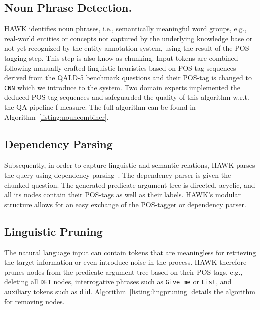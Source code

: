 \subsection{Noun Phrase Detection.}
HAWK identifies noun phrases, i.e., semantically meaningful word groups, e.g., real-world entities or concepts not captured by the underlying knowledge base or not yet recognized by the entity annotation system, using the result of the POS-tagging step. 
This step is also know as chunking. 
Input tokens are combined following manually-crafted linguistic heuristics based on POS-tag sequences derived from the \ac{QALD}-5 benchmark questions and their POS-tag is changed to \texttt{CNN} which we introduce to the system.
Two domain experts implemented the deduced POS-tag sequences and safeguarded the quality of this algorithm w.r.t. the \ac{QA} pipeline f-measure. 
The full algorithm can be found in Algorithm~\ref{listing:nouncombiner}.




\subsection{Dependency Parsing}

Subsequently, in order to capture linguistic and semantic relations, HAWK parses the query using dependency parsing~\cite{choi2011getting}.
The dependency parser is given the chunked question. 
The generated pre\-dicate-argument tree is directed, acyclic, and all its nodes contain their POS-tags as well as their labels.
HAWK's modular structure allows for an easy exchange of the POS-tagger or dependency parser.

\subsection{Linguistic Pruning}

The natural language input can contain tokens that are meaningless for retrieving the target information or even introduce noise in the process.
HAWK therefore prunes nodes from the predicate-argument tree based on their POS-tags, e.g., deleting all \texttt{DET} nodes, interrogative phrases such as \texttt{Give me} or \texttt{List}, and auxiliary tokens such as \texttt{did}.
Algorithm~\ref{listing:lingpruning} details the algorithm for removing nodes.




